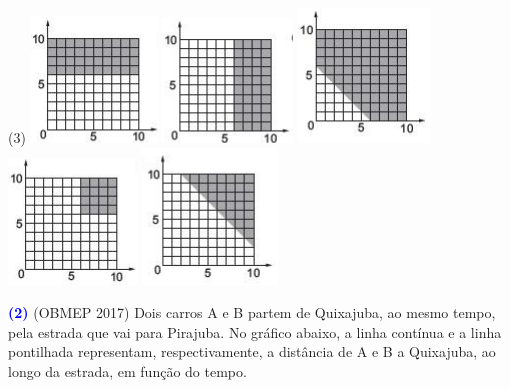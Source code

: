 \documentclass[12pt, a4paper]{article}
\newcommand{\negrito}[1]{\mbox{\boldmath{$#1$}}}
\begin{document}
\begin{tasks}[counter-format={(tsk[a])},label-width=3.6ex, label-format = {\bfseries}, column-sep = {0pt}](3)
\task[\textcolor{Floresta}{$\negrito{(a)} $}] \includegraphics[scale=1.1]{Figuras/2enc2ciclo1.png}
\task[\textcolor{Floresta}{$\negrito{(b)} $}] \includegraphics[scale=1.1]{Figuras/3enc2ciclo1.png}
\task[\textcolor{Floresta}{$\negrito{(c)} $}] \includegraphics[scale=1.03]{Figuras/4enc2ciclo1.png}
\task[\textcolor{Floresta}{$\negrito{(d)} $}] 
\includegraphics[scale=1.1]{Figuras/5enc2ciclo1.png}
\task[\textcolor{Floresta}{$\negrito{(e)} $}] 
\includegraphics[scale=1.1]{Figuras/6enc2ciclo1.png}
\end{tasks}
\textcolor{blue}{\bf(2)} (OBMEP 2017) Dois carros A e B partem de Quixajuba, ao mesmo tempo, pela estrada que vai para Pirajuba. No gráfico abaixo, a linha contínua e a linha pontilhada representam, respectivamente, a distância de A e B a Quixajuba, ao longo da estrada, em função do tempo.
\end{document}
